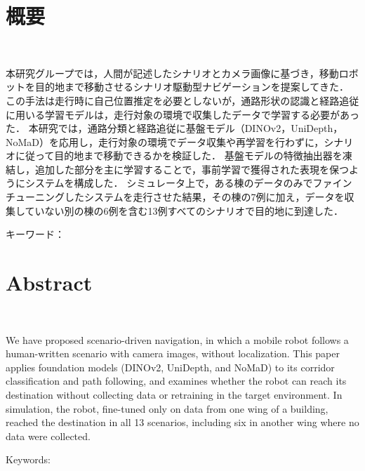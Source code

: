 \chapter*{概要}
\thispagestyle{empty}
\begin{center}
  \\
\end{center}
\vspace{1.0zh}

本研究グループでは，人間が記述したシナリオとカメラ画像に基づき，移動ロボットを目的地まで移動させるシナリオ駆動型ナビゲーションを提案してきた．
この手法は走行時に自己位置推定を必要としないが，通路形状の認識と経路追従に用いる学習モデルは，走行対象の環境で収集したデータで学習する必要があった．
本研究では，通路分類と経路追従に基盤モデル（DINOv2，UniDepth，NoMaD）を応用し，走行対象の環境でデータ収集や再学習を行わずに，シナリオに従って目的地まで移動できるかを検証した．
基盤モデルの特徴抽出器を凍結し，追加した部分を主に学習することで，事前学習で獲得された表現を保つようにシステムを構成した．
シミュレータ上で，ある棟のデータのみでファインチューニングしたシステムを走行させた結果，その棟の7例に加え，データを収集していない別の棟の6例を含む13例すべてのシナリオで目的地に到達した．

\vspace{1.0zh}
\noindent キーワード：

\newpage
\chapter*{Abstract}
\thispagestyle{empty}
\begin{center}
  \\
\end{center}
\vspace{1.0zh}

We have proposed scenario-driven navigation, in which a mobile robot follows a human-written scenario with camera images, without localization.
This paper applies foundation models (DINOv2, UniDepth, and NoMaD) to its corridor classification and path following, and examines whether the robot can reach its destination without collecting data or retraining in the target environment.
In simulation, the robot, fine-tuned only on data from one wing of a building, reached the destination in all 13 scenarios, including six in another wing where no data were collected.

\vspace{1.0zh}
\noindent Keywords:
